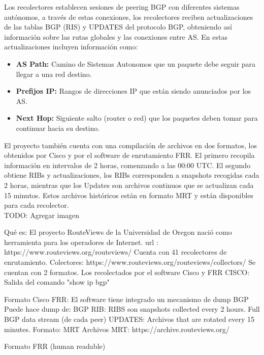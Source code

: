 Los recolectores establecen sesiones de peering BGP con diferentes sistemas autónomos, a través de estas conexiones, los recolectores reciben actualizaciones de las tablas BGP (RIS) y UPDATES del protocolo BGP, obteniendo así información sobre las rutas globales y las conexiones entre AS.
En estas actualizaciones incluyen información como:
\begin{itemize}
    \item \textbf{AS Path:} Camino de Sistemas Autonomos que un paquete debe seguir para llegar a una red destino.
    \item \textbf{Prefijos IP:} Rangos de direcciones IP que están siendo anunciados por los AS.
    \item \textbf{Next Hop:} Siguiente salto (router o red) que los paquetes deben tomar para continuar hacia su destino.
\end{itemize}


El proyecto también cuenta con una compilación de archivos en dos formatos, los obtenidos por Cisco y por el software de enrutamiento FRR. El primero recopila información en intervalos de 2 horas, comenzando a las 00:00 UTC. El segundo obtiene RIBs y actualizaciones, los RIBs corresponden a snapshots recogidas cada 2 horas, mientras que los Updates son archivos continuos que se actualizan cada 15 minutos. Estos archivos históricos están en formato MRT y están disponibles para cada recolector.\\



TODO: Agregar imagen 





Qué es: El proyecto RouteViews de la Universidad de Oregon nació como herramienta para los operadores de Internet.
url : https://www.routeviews.org/routeviews/
Cuenta con 41 recolectores de enrutamiento.
Colectores: https://www.routeviews.org/routeviews/collectors/	
Se cuentan con 2 formatos. Los recolectados por el software Cisco y FRR  
CISCO:
Salida del comando "show ip bgp"

Formato Cisco
FRR:
El software tiene integrado un mecanismo de dump BGP
Puede hace dump de:
BGP RIB:
RIBS son snapshots collected every 2 hours.
Full BGP data stream (de cada peer)
UPDATES:
Archivos that are rotated every 15 minutes. 
Formato: MRT
Archivos MRT: https://archive.routeviews.org/


Formato FRR (human readable)













